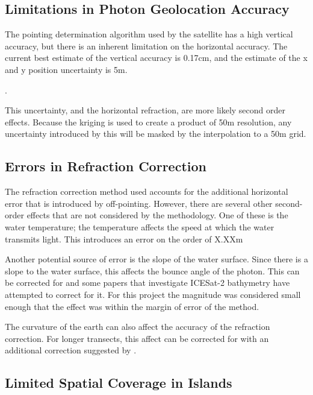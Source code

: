 \subsection{Limitations in Photon Geolocation Accuracy}

The pointing determination algorithm used by the satellite has a high vertical accuracy, but there is an inherent limitation on the horizontal accuracy. The current best estimate of the vertical accuracy is 0.17cm, and the estimate of the x and y position uncertainty is 5m.

.

This uncertainty, and the horizontal refraction, are more likely second order effects. Because the kriging is used to create a product of 50m resolution, any uncertainty introduced by this will be masked by the interpolation to a 50m grid.


\subsection{Errors in Refraction Correction}

The refraction correction method used accounts for the additional horizontal error that is introduced by off-pointing. However, there are several other second-order effects that are not considered by the methodology. One of these is the water temperature; the temperature affects the speed at which the water transmits light. This introduces an error on the order of X.XXm 

Another potential source of error is the slope of the water surface. Since there is a slope to the water surface, this affects the bounce angle of the photon. This can be corrected for and some papers that investigate ICESat-2 bathymetry have attempted to correct for it. For this project the magnitude was considered small enough that the effect was within the margin of error of the method.

The curvature of the earth can also affect the accuracy of the refraction correction. For longer transects, this affect can be corrected for with an additional correction suggested by \citeauthor{Parrish2019}. 

\subsection{Limited Spatial Coverage in Islands}

